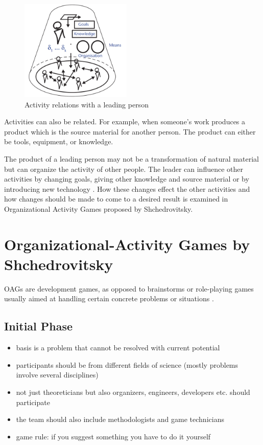 \documentclass[a4paper,11pt]{article}
\begin{document}
\begin{figure}[h] 
  \centering
     \includegraphics[width=200px]{fig1.png}
  \caption{Activity relations with a leading person \cite[p. 38]{5}}
  \label{ARLP} 
\end{figure}

Activities can also be related. For example, when someone’s work produces a
product which is the source material for another person. The product can
either be tools, equipment, or knowledge.

The product of a leading person may not be a transformation of natural
material but can organize the activity of other people. The leader can
influence other activities by changing goals, giving other knowledge and
source material or by introducing new technology \cite[p. 38]{5}. How these
changes effect the other activities and how changes should be made to come to
a desired result is examined in Organizational Activity Games proposed by
Shchedrovitsky.

\section{Organizational-Activity Games by Shchedrovitsky}
OAGs are development games, as opposed to brainstorms or role-playing games
usually aimed at handling certain concrete problems or situations \cite{4}.

\subsection{Initial Phase}
\begin{itemize}
\item basis is a problem that cannot be resolved with current potential
\item participants should be from different fields of science (mostly problems
  involve several disciplines)
\item not just theoreticians but also organizers, engineers, developers
  etc. should participate
\item the team should also include methodologists and game technicians
\item game rule: if you suggest something you have to do it yourself
\end{itemize}
\end{document}
